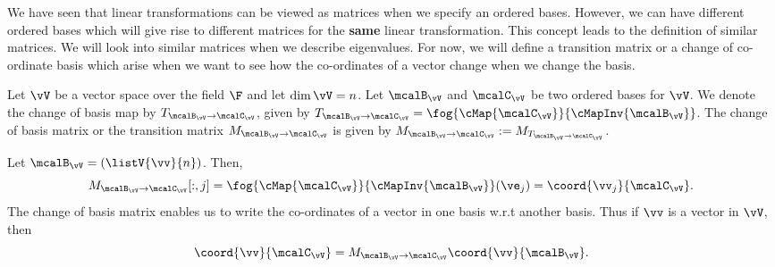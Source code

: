 We have seen that linear transformations can be viewed as matrices when we specify an ordered bases. However,
we can have different ordered bases which will give rise to different matrices for the \textbf{same} linear
transformation. This concept leads to the definition of similar matrices. We will look into similar matrices
when we describe eigenvalues. For now, we will define a transition matrix or a change of co-ordinate basis
which arise when we want to see how the co-ordinates of a vector change when we change the basis.

\begin{Definition}[name=Change of Basis]
    Let $\vV$ be a vector space over the field $\F$ and let $\dim{\vV} = n$. Let $\mcalB_{\vV}$ and
    $\mcalC_{\vV}$ be two ordered bases for $\vV$. We denote the change of basis map by 
    $T_{\mcalB_{\vV}\to \mcalC_{\vV}}$,
    given by $T_{\mcalB_{\vV}\to \mcalC_{\vV}} = \fog{\cMap{\mcalC_{\vV}}}{\cMapInv{\mcalB_{\vV}}}$. 
    The change of basis
    matrix or the transition matrix $M_{\mcalB_{\vV}\to \mcalC_{\vV}}$ is given by 
    $M_{\mcalB_{\vV}\to \mcalC_{\vV}} := M_{T_{\mcalB_{\vV}\to \mcalC_{\vV}}}$.
\end{Definition}
\begin{Remark}
    Let $\mcalB_{\vV} = (\listV{\vv}{n})$. Then, \[M_{\mcalB_{\vV}\to \mcalC_{\vV}}[:,j] =
    \fog{\cMap{\mcalC_{\vV}}}{\cMapInv{\mcalB_{\vV}}}(\ve_{j}) = \coord{\vv_{j}}{\mcalC_{\vV}}.\] 
    The change of basis matrix enables us to write the co-ordinates of a vector in one basis w.r.t another basis.
    Thus if $\vv$ is a vector in $\vV$, then 
    \[\coord{\vv}{\mcalC_{\vV}} = M_{\mcalB_{\vV}\to \mcalC_{\vV}}\coord{\vv}{\mcalB_{\vV}}.\]
\end{Remark}
